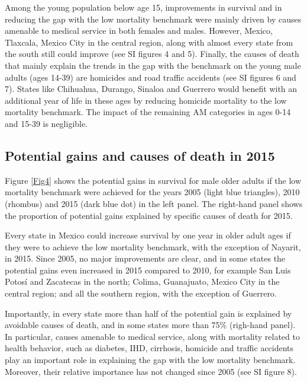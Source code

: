 \documentclass{bmcart}
\begin{document}
Among the young population below age 15, improvements in survival and in reducing the gap with the low mortality benchmark were mainly driven by causes amenable to medical service in both females and males. However,  Mexico, Tlaxcala, Mexico City in the central region, along with almost every state from the south still could improve (see SI figures 4 and 5). Finally, the causes of death that mainly explain the trends in the gap with the benchmark on the young male adults (ages 14-39) are homicides and road traffic accidents (see SI figures 6 and 7). States like Chihuahua, Durango, Sinaloa and Guerrero would benefit with an additional year of life in these ages by reducing homicide mortality to the low mortality benchmark. The impact of the remaining  AM categories in ages 0-14 and 15-39 is negligible. \\



\subsection*{Potential gains and causes of death in 2015}

Figure \ref{Fig4} shows the potential gains in survival for male older adults if the low mortality benchmark were achieved for the years 2005 (light blue triangles), 2010 (rhombus) and 2015 (dark blue dot) in the left panel. The right-hand panel shows the proportion of potential gains explained by specific causes of death for 2015.

Every state in Mexico could increase survival by one year in older adult ages if they were to achieve the low mortality benchmark, with the exception of Nayarit, in 2015. Since 2005, no major improvements are clear, and in some states the potential gains even increased in 2015 compared to 2010, for example San Luis Potos\'i and Zacatecas in the north; Colima, Guanajuato, Mexico City in the central region; and all the southern region, with the exception of Guerrero. 

Importantly, in every state more than half of the potential gain is explained by avoidable causes of death, and in some states more than 75\% (righ-hand panel). In particular, causes amenable to medical service, along with mortality related to health behavior, such as diabetes, IHD, cirrhosis, homicide and traffic accidents play an important role in explaining the gap with the low mortality benchmark. Moreover, their relative importance has not changed since 2005 (see SI figure 8).\\
\end{document}
